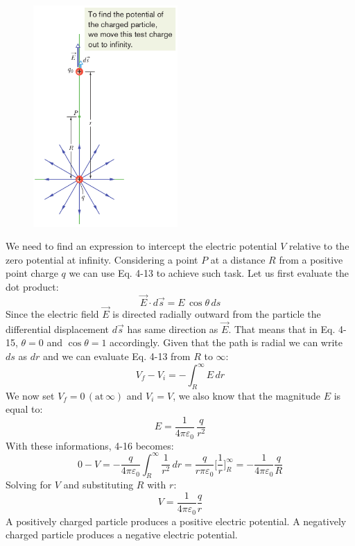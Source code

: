 \documentclass[12pt, a4paper]{article}
\begin{document}
		\begin{figure}
			\centering
			\includegraphics[width=5.5cm]{Physics2_PNGs/point-charge-potential.png}
			\caption*{}
			\label{fig:point-charge-potential.png}
		\end{figure}
		We need to find an expression to intercept the electric potential $V$ relative to the zero potential at infinity. Considering a point $P$ at a distance $R$ from a  positive point charge $q$ we can use Eq. 4-13 to achieve such task. Let us first evaluate the dot product: 
		\begin{equation*}
			\vec{E} \cdot d\vec{s} = E \, \cos\theta \, ds
			\tag{4-15}
		\end{equation*}
		Since the electric field $\vec{E}$ is directed radially outward from the particle the differential displacement $d\vec{s}$ has same direction as $\vec{E}$. That means that in Eq. 4-15, $\theta = 0$ and $\cos\theta = 1$ accordingly. Given that the path is radial we can write $ds$ as $dr$ and we can evaluate Eq. 4-13 from $R$ to $\infty$:
		\begin{equation}
			V_f - V_i = - \int_{R}^{\infty} E \, dr
			\tag{4-16}
		\end{equation}
		We now set $V_f = 0 \, ( \text{at} \, \infty )$ and $V_i = V$, we also know that the magnitude $E$ is equal to:
		\[
			E = \frac{1}{4 \pi \varepsilon_0} \, \frac{q}{r^2}
		\]
		With these informations, 4-16 becomes:
		\begin{equation*}
			0 - V = - \frac{q}{4 \pi \varepsilon_0} \int_{R}^{\infty} \frac{1}{r^2} \, dr
				  = \frac{q}{r \pi \varepsilon_0} \biggl[ \frac{1}{r} \biggl]_R^\infty
				  = - \frac{1}{4 \pi \varepsilon_0} \frac{q}{R}
			\tag{4-17}
		\end{equation*}
		Solving for $V$ and substituting $R$ with $r$:
		\begin{equation*}
			V = \frac{1}{4 \pi \varepsilon_0} \frac{q}{r}
			\tag{Potential due to Point Charge, 4-18}
		\end{equation*}
		A positively charged particle produces a positive electric potential. A negatively
		charged particle produces a negative electric potential. 
		
\end{document}
